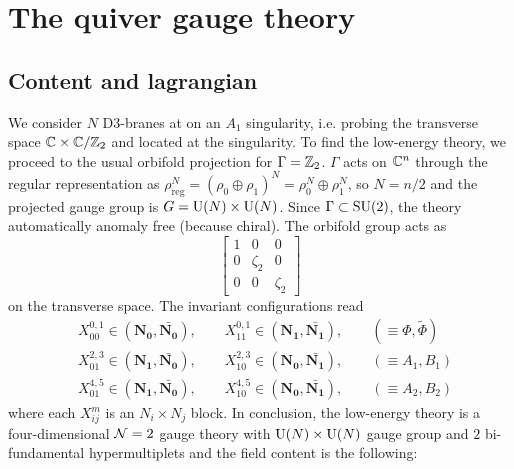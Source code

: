 \section{The quiver gauge theory}

    \subsection{Content and lagrangian}

        We consider $N$ D$3$-branes at on an $A_1$ singularity, i.e. probing the transverse space $\mathbb{C}\times\mathbb{C}/\mathbb{Z}_2$ and located at the singularity. To find the low-energy theory, we proceed to the usual orbifold projection for $\Gamma=\mathbb{Z}_2$. $\Gamma$ acts on $\mathbb{C}^n$ through the regular representation as $\rho^N_{\text{reg}}=(\rho_0\oplus\rho_1)^N=\rho^N_0\oplus\rho^N_1$, so $N=n/2$ and the projected gauge group is $G=\text{U}(N)\times\text{U}(N)$. Since $\Gamma\subset\text{SU}(2)$, the theory automatically anomaly free (because chiral). The orbifold group acts as
        \begin{equation}
            \begin{bmatrix}
                1 & 0 & 0 \\
                0 & \zeta_2 & 0 \\
                0 & 0 & \zeta_2
            \end{bmatrix}
        \end{equation}
        on the transverse space. The invariant configurations read
        \begin{align}
            &X^{0,1}_{00}\in(\boldsymbol{N_0},\bar{\boldsymbol{N_0}}),\qquad X^{0,1}_{11}\in(\boldsymbol{N_1},\bar{\boldsymbol{N_1}}),\qquad (\equiv\Phi,\tilde{\Phi})\\
            &X^{2,3}_{01}\in(\boldsymbol{N_1},\bar{\boldsymbol{N_0}}),\qquad X^{2,3}_{10}\in(\boldsymbol{N_0},\bar{\boldsymbol{N_1}}),\qquad (\equiv A_1,B_1)\\
            &X^{4,5}_{01}\in(\boldsymbol{N_1},\bar{\boldsymbol{N_0}}),\qquad X^{4,5}_{10}\in(\boldsymbol{N_0},\bar{\boldsymbol{N_1}}),\qquad (\equiv A_2,B_2)
        \end{align}
        where each $X^m_{ij}$ is an $N_i\times N_j$ block. In conclusion, the low-energy theory is a four-dimensional $\mathcal{N}=2$ gauge theory with $\text{U}(N)\times\text{U}(N)$ gauge group and $2$ bi-fundamental hypermultiplets and the field content is the following:
